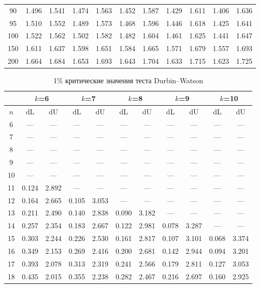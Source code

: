 \documentclass[12pt]{article}
\begin{document}
\begin{table}
\begin{center}
{\begin{tabular}{|c|c|c|c|c|c|c|c|c|c|c|}
	90&1.496&1.541&1.474&1.563&1.452&1.587&1.429&1.611&1.406&1.636\\
	95&1.510&1.552&1.489&1.573&1.468&1.596&1.446&1.618&1.425&1.641\\
	100&1.522&1.562&1.502&1.582&1.482&1.604&1.461&1.625&1.441&1.647\\
	150&1.611&1.637&1.598&1.651&1.584&1.665&1.571&1.679&1.557&1.693\\
	200&1.664&1.684&1.653&1.693&1.643&1.704&1.633&1.715&1.623&1.725\\
	\hline
\end{tabular}
}
\end{center}
\end{table}


\begin{table}
\caption{1\% критические значения теста Durbin--Watson}
\begin{center}
{\footnotesize
\begin{tabular}{|c|c|c|c|c|c|c|c|c|c|c|}
	\hline
	& \multicolumn{2}{c|}{$k$=6} & \multicolumn{2}{c|}{$k$=7}&
	\multicolumn{2}{c|}{$k$=8}& \multicolumn{2}{c|}{$k$=9} & \multicolumn{2}{c|}{$k$=10} \\
	\hline
	$n$ &dL &dU& dL& dU &dL &dU& dL &dU &dL& dU\\ \hline
	6&---&---&---&---&---&---&---&---&---&---\\
	7&---&---&---&---&---&---&---&---&---&---\\
	8&---&---&---&---&---&---&---&---&---&---\\
	9&---&---&---&---&---&---&---&---&---&---\\
	10&---&---&---&---&---&---&---&---&---&---\\
	11&0.124&2.892&---&---&---&---&---&---&---&---\\
	12&0.164&2.665&0.105&3.053&---&---&---&---&---&---\\
	13&0.211&2.490&0.140&2.838&0.090&3.182&---&---&---&---\\
	14&0.257&2.354&0.183&2.667&0.122&2.981&0.078&3.287&---&---\\
	15&0.303&2.244&0.226&2.530&0.161&2.817&0.107&3.101&0.068&3.374\\
	16&0.349&2.153&0.269&2.416&0.200&2.681&0.142&2.944&0.094&3.201\\
	17&0.393&2.078&0.313&2.319&0.241&2.566&0.179&2.811&0.127&3.053\\
	18&0.435&2.015&0.355&2.238&0.282&2.467&0.216&2.697&0.160&2.925\\

\end{tabular}}
\end{center}
\end{table}
\end{document}
